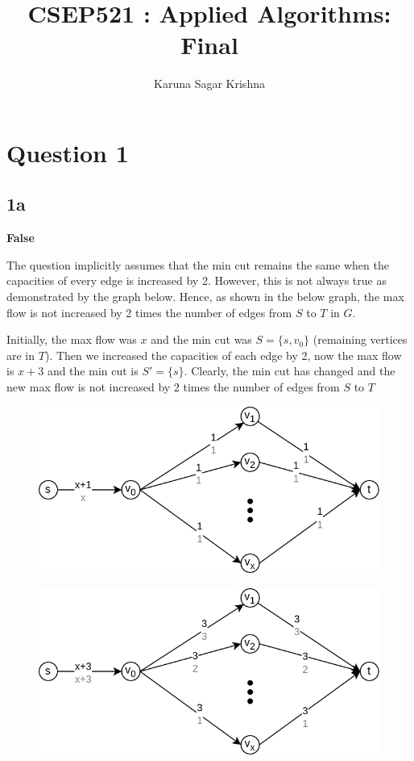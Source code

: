 \documentclass{article}
\title{CSEP521 : Applied Algorithms: Final}
\author{Karuna Sagar Krishna}
\begin{document}
    \maketitle

    \section*{Question 1}

    \subsection*{1a}
    \textbf{False}

    The question implicitly assumes that the min cut remains the same when the capacities of every edge is increased by 2. However, this is not always true as demonstrated by the graph below. Hence, as shown in the below graph, the max flow is not increased by 2 times the number of edges from $S$ to $T$ in $G$.

    Initially, the max flow was $x$ and the min cut was $S = \{s, v_0\}$ (remaining vertices are in $T$). Then we increased the capacities of each edge by 2, now the max flow is $x+3$ and the min cut is $S' = \{s\}$. Clearly, the min cut has changed and the new max flow is not increased by 2 times the number of edges from $S$ to $T$

    \begin{figure}[H]
        \includegraphics[width=1\textwidth]{maxflowIncreasedCapacity1.png}
    \end{figure}

    \begin{figure}[H]
        \includegraphics[width=1\textwidth]{maxflowIncreasedCapacity2.png}
    \end{figure}
\end{document}
